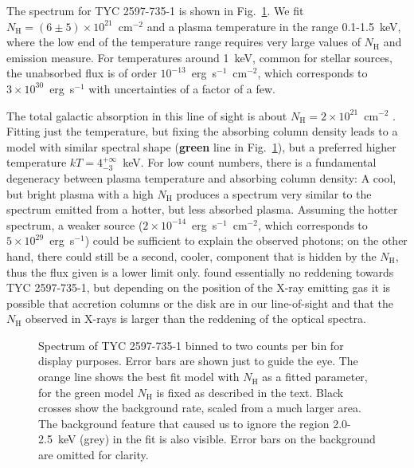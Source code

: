 \documentclass[linenumbers]{aastex631}
\begin{document}
The spectrum for TYC 2597-735-1 is shown in Fig.~\ref{fig:TYC_spec}. We fit $N_\mathrm{H}=(6\pm5)\times10^{21}$~cm$^{-2}$ and a plasma temperature in the range 0.1-1.5~keV, where the low end of the temperature range requires very large values of $N_\mathrm{H}$ and emission measure. For temperatures around 1~keV, common for stellar sources, the unabsorbed flux is of order $10^{-13}$~erg~s$^{-1}$~cm$^{-2}$, which corresponds to $3\times 10^{30}$~erg~s$^{-1}$ with uncertainties of a factor of a few.

The total galactic absorption in this line of sight is about $N_\mathrm{H}=2\times10^{21}$~cm$^{-2}$ \citep{1990ARA&A..28..215D}. Fitting just the temperature, but fixing the absorbing column density leads to a model with similar spectral shape (\textbf{green} line in Fig.~\ref{fig:TYC_spec}), but a preferred higher temperature $kT=4_{-3}^{+\infty}$~keV.
For low count numbers, there is a fundamental degeneracy between plasma temperature and absorbing column density: A cool, but bright plasma with a high $N_\mathrm{H}$ produces a spectrum very similar to the spectrum emitted from a hotter, but less absorbed plasma.
Assuming the hotter spectrum, a weaker source ($2\times10^{-14}$~erg~s$^{-1}$~cm$^{-2}$, which corresponds to $5\times 10^{29}$~erg~s$^{-1}$) could be sufficient to explain the observed photons; on the other hand, there could still be a second, cooler, component that is hidden by the $N_\mathrm{H}$, thus the flux given is a lower limit only. \cite{2020Natur.587..387H} found essentially no reddening towards TYC 2597-735-1, but depending on the position of the X-ray emitting gas it is possible that accretion columns or the disk are in our line-of-sight and that the $N_\mathrm{H}$ observed in X-rays is larger than the reddening of the optical spectra.

\begin{figure}
    \caption{Spectrum of TYC 2597-735-1 binned to two counts per bin for display purposes. Error bars are shown just to guide the eye. The orange line shows the best fit model with $N_\mathrm{H}$ as a fitted parameter, for the green model $N_\mathrm{H}$ is fixed as described in the text. Black crosses show the background rate, scaled from a much larger area. The background feature that caused us to ignore the region 2.0-2.5~keV (grey) in the fit is also visible. Error bars on the background are omitted for clarity.
    \label{fig:TYC_spec}}
\end{figure}
\end{document}
